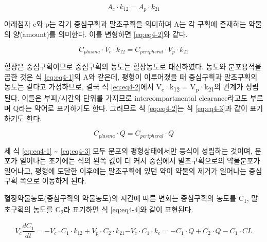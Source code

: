 \documentclass[
  11pt,
  krantz2, a4paper, twoside]{krantz}
\theoremstyle{definition}
\theoremstyle{definition}
\theoremstyle{definition}
\theoremstyle{definition}
\theoremstyle{remark}
\begin{document}
\begin{equation}
A_{c} \cdot k_{12} = A_{p} \cdot k_{21}
\label{eq:eq4-1}
\end{equation}

아래첨자 c와 p는 각기 중심구획과 말초구획을 의미하며 A는 각 구획에 존재하는 약물의 양(amount)를 의미한다. 이를 변형하면 \eqref{eq:eq4-2}와 같다.

\begin{equation}
C_{{plasma}} \cdot V_{c} \cdot k_{12} = C_{{peripheral}} \cdot V_{p} \cdot k_{21}
\label{eq:eq4-2}
\end{equation}

혈장은 중심구획이므로 중심구획의 농도는 혈장농도로 대신하였다. 농도와
분포용적을 곱한 것은 식 \eqref{eq:eq4-1}의 A와 같은데, 평형이 이루어졌을 때
중심구획과 말초구획의 농도는 같다고 가정하므로, 결국 식 \eqref{eq:eq4-2}에서
V\textsubscript{c}·k\textsubscript{12} = V\textsubscript{p}·k\textsubscript{21}의 관계가 성립된다. 이들은 부피/시간의 단위를
가지므로 intercompartmental clearance라고도 부르며 Q라는 약어로
표기하기도 한다. 그러므로 식 \eqref{eq:eq4-2}는 식 \eqref{eq:eq4-3}과 같이 표기하기도 한다.

\begin{equation}
C_{{plasma}} \cdot Q = C_{{peripheral}} \cdot Q
\label{eq:eq4-3}
\end{equation}

세 식 \eqref{eq:eq4-1} \textasciitilde{} \eqref{eq:eq4-3} 모두 분포의 평형상태에서만 등식이 성립하는 것이며, 분포가
일어나는 초기에는 식의 왼쪽 값이 더 커서 중심에서 말초구획으로의
약물분포가 일어나고, 평형에 도달한 이후에는 말초구획에 있던 약이 약물의
제거가 일어나는 중심구획 쪽으로 이동하게 된다.

혈장약물농도(중심구획의 약물농도)의 시간에 따른 변화는 중심구획의 농도를
C\textsubscript{1}, 말초구획의 농도를 C\textsubscript{2}라 표기하면 식 \eqref{eq:eq4-4}와 같이 표현된다.

\begin{equation}
V_{c}\frac{{dC}_{1}}{{dt}} = {- V}_{c} \cdot C_{1} \cdot k_{12} + V_{p} \cdot C_{2} \cdot k_{21}{- V}_{c} \cdot C_{1} \cdot k_{e} 
= - C_{1} \cdot Q + C_{2} \cdot Q - C_{1} \cdot {CL}
\label{eq:eq4-4}
\end{equation}
\end{document}
